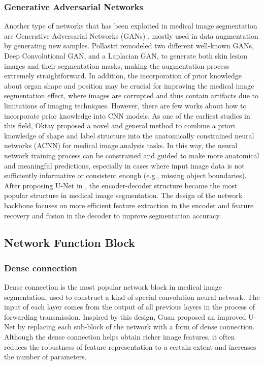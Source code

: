 \subsubsection{Generative Adversarial Networks}
\label{subsubsec:gan}
Another type of networks that has been exploited in medical image segmentation
are Generative Adversarial Networks (GANs) \cite{goodfellow2020gan}, mostly used
in data augmentation by generating new samples. Pollastri \etal
\cite{pollastri2020gan} remodeled two different well-known GANs, Deep
Convolutional GAN, and a Laplacian GAN, to generate both skin lesion images and
their segmentation masks, making the augmentation process extremely
straightforward.
In addition, the incorporation of prior knowledge about organ shape and position
may be crucial for improving the medical image segmentation effect, where images
are corrupted and thus contain artifacts due to limitations of imaging
techniques. However, there are few works about how to incorporate prior
knowledge into CNN models. As one of the earliest studies in this field, Oktay
\etal \cite{oktay2017acnn} proposed a novel and general method to combine a
priori knowledge of shape and label structure into the anatomically constrained
neural networks (ACNN) for medical image analysis tasks. In this way, the neural
network training process can be constrained and guided to make more anatomical
and meaningful predictions, especially in cases where input image data is not
sufficiently informative or consistent enough (e.g., missing object
boundaries).\\

After proposing U-Net in \cite{ronneberger2015unet}, the encoder-decoder
structure became the most popular structure in medical image segmentation. The
design of the network backbone focuses on more efficient feature extraction in
the encoder and feature recovery and fusion in the decoder to improve
segmentation accuracy.

\subsection{Network Function Block}
\subsubsection{Dense connection}
Dense connection is the most popular network block in medical image
segmentation, used to construct a kind of special convolution neural network.
The input of each layer comes from the output of all previous layers in the
process of forwarding transmission. Inspired by this design, Guan \etal
\cite{guan2019fully} proposed an improved U-Net by replacing each sub-block of
the network with a form of dense connection. Although the dense connection helps
obtain richer image features, it often reduces the robustness of feature
representation to a certain extent and increases the number of parameters.

